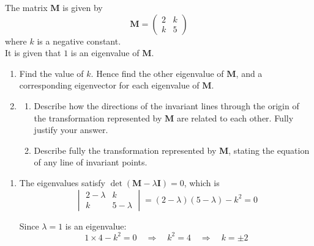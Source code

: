\documentclass[leqno]{article}
\begin{document}
\begin{enumerate}[
  label=\textbf{\arabic*.},
  leftmargin=*,
  topsep=0pt,
  partopsep=0pt,
  parsep=0pt
]
\begin{djsSolution}
\begin{enumerate}[label=\textbf{(\alph*)}, start=1]
\end{enumerate}
\end{djsSolution}

\newpage

\questionitem

The matrix $\mathbf{M}$ is given by
\[\mathbf{M} = \begin{pmatrix} 2 & k \\ k & 5 \end{pmatrix}\]
where $k$ is a negative constant. \\

It is given that $1$ is an eigenvalue of $\mathbf{M}$. \\

\begin{enumerate}[label=\textbf{(\alph*)}]
  \item Find the value of $k$. Hence find the other eigenvalue of $\mathbf{M}$, and a corresponding eigenvector for each eigenvalue of $\mathbf{M}$.  \\
  \item
  \begin{enumerate}[label=(\roman*)]
    \item Describe how the directions of the invariant lines through the origin of the transformation represented by $\mathbf{M}$ are related to each other. Fully justify your answer. 
    \item Describe fully the transformation represented by $\mathbf{M}$, stating the equation of any line of invariant points.  \\
  \end{enumerate}
\end{enumerate}

\vspace*{10pt}

\begin{djsSolution}
\begin{enumerate}[label=\textbf{(\alph*)}, start=1]
  \item The eigenvalues satisfy \(\det(\mathbf{M}-\lambda\mathbf{I})=0\), which is
\[
\begin{vmatrix} 2-\lambda & k \\ k & 5-\lambda \end{vmatrix}=(2-\lambda)(5-\lambda)-k^2=0
\]

Since \(\lambda=1\) is an eigenvalue:
\[
1\times4-k^2=0\quad\Longrightarrow\quad k^2=4\quad\Longrightarrow\quad k=\pm 2
\]


\end{enumerate}
\end{djsSolution}
\end{enumerate}
\end{document}
